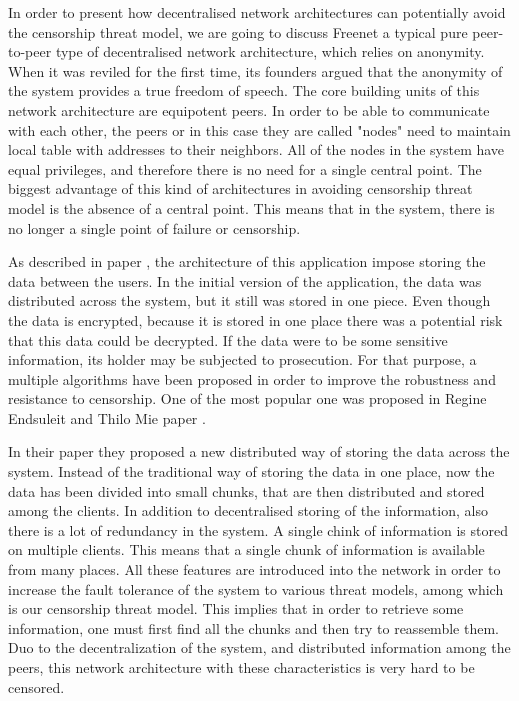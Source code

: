 In order to present how decentralised network architectures can potentially avoid the censorship threat model, we are going to discuss Freenet \cite{clarke2001} a typical pure peer-to-peer \cite{web:peertopeer} type of decentralised network architecture, which relies on anonymity.
When it was reviled for the first time, its founders argued that the anonymity of the system provides a true freedom of speech.
The core building units of this network architecture are equipotent peers.
In order to be able to communicate with each other, the peers or in this case they are called "nodes" need to maintain local table with addresses to their neighbors.
All of the nodes in the system have equal privileges, and therefore there is no need for a single central point.
The biggest advantage of this kind of architectures in avoiding censorship threat model is the absence of a central point.
This means that in the system, there is no longer a single point of failure or censorship.  

As described in paper \cite{clarke2001}, the architecture of this application impose storing the data between the users.
In the initial version of the application, the data was distributed across the system, but it still was stored in one piece.
Even though the data is encrypted, because it is stored in one place there was a potential risk that this data could be decrypted.
If the data were to be some sensitive information, its holder may be subjected to prosecution.
For that purpose, a multiple algorithms have been proposed in order to improve the robustness and resistance to censorship.
One of the most popular one was proposed in Regine Endsuleit and Thilo Mie paper \cite{endsuleit2006}. 

In their paper they proposed a new distributed way of storing the data across the system.
Instead of the traditional way of storing the data in one place, now the data has been divided into small chunks, that are then distributed and stored among the clients.
In addition to decentralised storing of the information, also there is a lot of redundancy in the system.
A single chink of information is stored on multiple clients.
This means that a single chunk of information is available from many places.
All these features are introduced into the network in order to increase the fault tolerance of the system to various threat models, among which is our censorship threat model.
This implies that in order to retrieve some information, one must first find all the chunks and then try to reassemble them.
Duo to the decentralization of the system, and distributed information among the peers, this network architecture with these characteristics is very hard to be censored.
